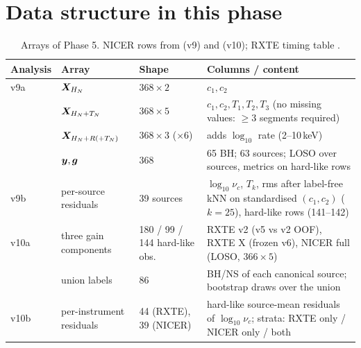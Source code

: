 \section{Data structure in this phase}\label{sec:p5structure}
\begin{table}[htbp]
\centering\small
\caption[Phase 5 arrays]{Arrays of Phase 5. NICER rows from  (v9) and
 (v10); RXTE timing table .}
\label{tab:p5arrays}
\begin{tabularx}{\textwidth}{@{}p{1.5cm}p{2.3cm}p{2.0cm}X@{}}
\toprule
Analysis & Array & Shape & Columns / content \\
\midrule
v9a & $\bm{X}_{H_N}$ & $368\times2$ & $c_1,c_2$ \\
 & $\bm{X}_{H_N+T_N}$ & $368\times5$ & $c_1,c_2,T_1,T_2,T_3$ (no missing values: $\ge3$ segments required) \\
 & $\bm{X}_{H_N+R(+T_N)}$ & $368\times3$ ($\times6$) & adds $\log_{10}$ rate (2--10\,keV) \\
 & $\bm{y},\bm{g}$ & 368 & 65 BH; 63 sources; LOSO over sources, metrics on hard-like rows \\
v9b & per-source residuals & 39 sources & $\log_{10}\nu_c$, $T_k$, rms after label-free kNN on standardised $(c_1,c_2)$ ($k=25$), hard-like rows (141--142) \\
v10a & three gain components & 180 / 99 / 144 hard-like obs. & RXTE v2 (v5 vs v2 OOF), RXTE X (frozen v6), NICER full (LOSO, $366\times5$) \\
 & union labels & 86 & BH/NS of each canonical source; bootstrap draws over the union \\
v10b & per-instrument residuals & 44 (RXTE), 39 (NICER) & hard-like source-mean residuals of $\log_{10}\nu_c$; strata: RXTE only / NICER only / both \\
\bottomrule
\end{tabularx}
\end{table}

